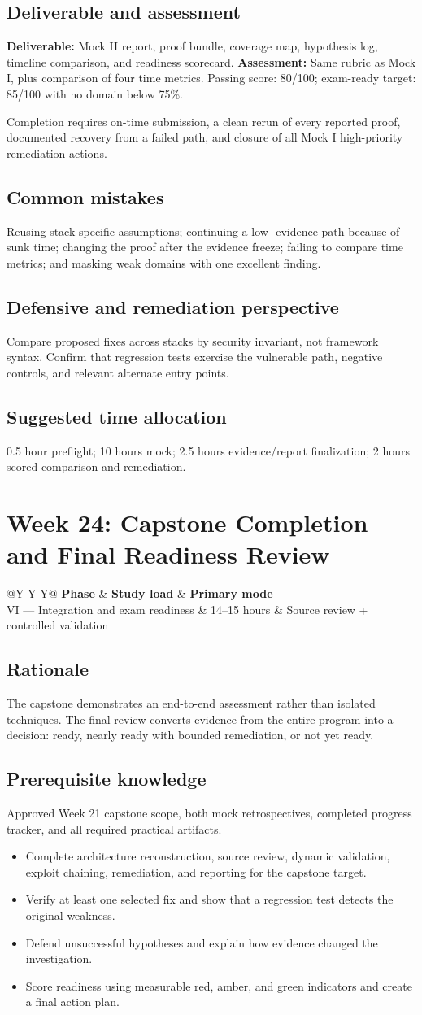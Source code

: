 \documentclass[11pt]{article}
\makeatletter
\newcommand{\weekheader}[4]{%
  \clearpage
  \section{Week #1: #2}
  \begin{tcolorbox}[colback=Navy,colframe=Navy,coltext=white]
    \begin{tabularx}{\linewidth}{@{}Y Y Y@{}}
      \textbf{Phase} & \textbf{Study load} & \textbf{Primary mode}\\
      #3 & #4 hours & Source review + controlled validation
    \end{tabularx}
  \end{tcolorbox}
}
\newcommand{\weekfield}[2]{%
  \Needspace{5\baselineskip}
  \subsection*{#1}
  #2
}
\newcommand{\deliverable}[1]{\textbf{Deliverable:} #1}
\newcommand{\assessment}[1]{\textbf{Assessment:} #1}
\makeatother
\begin{document}
\weekfield{Deliverable and assessment}{\deliverable{Mock II report, proof bundle,
coverage map, hypothesis log, timeline comparison, and readiness scorecard.}
\assessment{Same rubric as Mock I, plus comparison of four time metrics. Passing
score: 80/100; exam-ready target: 85/100 with no domain below 75\%.}}

\begin{checkpoints}
Completion requires on-time submission, a clean rerun of every reported proof,
documented recovery from a failed path, and closure of all Mock I high-priority
remediation actions.
\end{checkpoints}

\weekfield{Common mistakes}{Reusing stack-specific assumptions; continuing a low-
evidence path because of sunk time; changing the proof after the evidence freeze;
failing to compare time metrics; and masking weak domains with one excellent
finding.}

\weekfield{Defensive and remediation perspective}{Compare proposed fixes across
stacks by security invariant, not framework syntax. Confirm that regression tests
exercise the vulnerable path, negative controls, and relevant alternate entry
points.}

\weekfield{Suggested time allocation}{0.5 hour preflight; 10 hours mock; 2.5
hours evidence/report finalization; 2 hours scored comparison and remediation.}

\weekheader{24}{Capstone Completion and Final Readiness Review}{VI --- Integration and exam readiness}{14--15}

\weekfield{Rationale}{The capstone demonstrates an end-to-end assessment rather
than isolated techniques. The final review converts evidence from the entire
program into a decision: ready, nearly ready with bounded remediation, or not yet
ready.}

\weekfield{Prerequisite knowledge}{Approved Week 21 capstone scope, both mock
retrospectives, completed progress tracker, and all required practical artifacts.}

\begin{objectivebox}
\begin{itemize}
  \item Complete architecture reconstruction, source review, dynamic validation, exploit chaining, remediation, and reporting for the capstone target.
  \item Verify at least one selected fix and show that a regression test detects the original weakness.
  \item Defend unsuccessful hypotheses and explain how evidence changed the investigation.
  \item Score readiness using measurable red, amber, and green indicators and create a final action plan.
\end{itemize}
\end{objectivebox}
\end{document}
